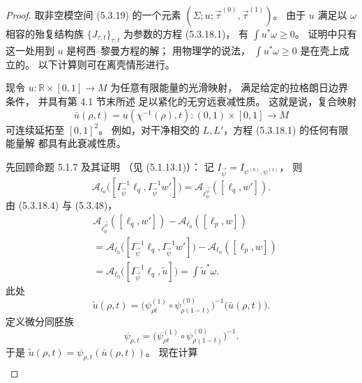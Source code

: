 \begin{proof}
取非空模空间 (5.3.19) 的一个元素
$(\Sigma;u;
\vec\tau^{(0)},\vec\tau^{(1)})$。
由于 $u$ 满足以
$\omega$ 相容的殆复结构族
$\{J_{\tau,t}\}_{\tau,t}$
为参数的方程 (5.3.18.1)，
有 $\int u^*\omega\ge0$。
证明中只有这一处用到
$u$ 是柯西--黎曼方程的解；
用物理学的说法，
$\int u^*\omega\ge0$
是在壳上成立的。
以下计算则可在离壳情形进行。

现令 $u\colon\mathbb R\times[0,1]\to M$
为任意有限能量的光滑映射，
满足给定的拉格朗日边界条件，
并具有第 4.1 节末所述
足以紧化的无穷远衰减性质。
这就是说，复合映射
\[
\bar u(\rho,t)
=u(\chi^{-1}(\rho),t)
\colon(0,1)\times[0,1]\to M
\]
可连续延拓至 $[0,1]^2$。
例如，对干净相交的
$L,L'$，方程 (5.3.18.1)
的任何有限能量解
都具有此衰减性质。

先回顾命题 5.1.7 及其证明
（见 (5.1.13.1)）：
记
$I_{\vec\psi}
=I_{\psi^{(0)},\psi^{(1)}}$，
则
\begin{equation}
\mathcal A_{\ell_0}
\bigl(
[I_{\vec\psi}^{-1}\ell_q,
 I_{\vec\psi}^{-1}w']
\bigr)
=
\mathcal A_{\ell_0^{\vec\psi}}
([\ell_q,w']).
\tag{5.3.48}\label{eq:5-3-48}
\end{equation}
由 (5.3.18.4) 与 (5.3.48)，
\begin{equation}
\begin{aligned}
&
\mathcal A_{\ell_0^{\vec\psi}}
([\ell_q,w'])
-\mathcal A_{\ell_0}([\ell_p,w])
\\
&=
\mathcal A_{\ell_0}
\bigl([I_{\vec\psi}^{-1}\ell_q,
I_{\vec\psi}^{-1}w']\bigr)
-\mathcal A_{\ell_0}([\ell_p,w])
\\
&=
\mathcal A_{\ell_0}
\bigl([I_{\vec\psi}^{-1}\ell_q,
\widetilde u]\bigr)
=\int\widetilde u^{*}\omega.
\end{aligned}
\tag{5.3.49}\label{eq:5-3-49}
\end{equation}
此处
\[
\widetilde u(\rho,t)
=
\bigl(
\psi^{(1)}_{\rho t}
\circ
\psi^{(0)}_{\rho(1-t)}
\bigr)^{-1}
\bigl(\bar u(\rho,t)\bigr).
\]
定义微分同胚族
\begin{equation}
\psi_{\rho,t}
=
\bigl(
\psi^{(1)}_{\rho t}
\circ
\psi^{(0)}_{\rho(1-t)}
\bigr)^{-1}.
\tag{5.3.50}\label{eq:5-3-50}
\end{equation}
于是
$\widetilde u(\rho,t)
=\psi_{\rho,t}(\bar u(\rho,t))$。
现在计算
\begin{equation}
\begin{aligned}

\end{aligned}
\end{equation}
\end{proof}
